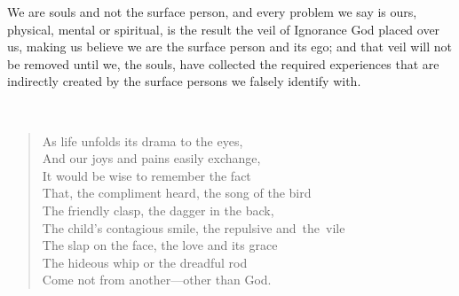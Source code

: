 \documentclass[12pt,a4paper]{book}
\begin{document}
We are souls and not the surface person, and every problem we say is
ours, physical, mental or spiritual, is the result the veil of
Ignorance God placed over us, making us believe we are the surface
person and its ego; and that veil will not be removed until we, the
souls, have collected the required experiences that are indirectly
created by the surface persons we falsely identify with.


\newpage
\setlength{\baselineskip}{8.5mm}
\
\vspace{5cm}
\thispagestyle{empty}

\begin{verse}
As life unfolds its drama to the eyes,\\
And our joys and pains easily exchange,\\
It would be wise to remember the fact\\
That, the compliment heard, the song of the bird\\
The friendly clasp, the dagger in the back,\\
The child's contagious smile, the repulsive and~the~vile\\
The slap on the face, the love and its grace\\
The hideous whip or the dreadful rod\\
Come not from another---other than God.
\end{verse}
\end{document}
